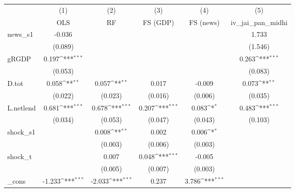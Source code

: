 {
\def\sym#1{\ifmmode^{#1}\else\(^{#1}\)\fi}
\begin{tabular}{l*{5}{c}}
\toprule
            &\multicolumn{1}{c}{(1)}&\multicolumn{1}{c}{(2)}&\multicolumn{1}{c}{(3)}&\multicolumn{1}{c}{(4)}&\multicolumn{1}{c}{(5)}\\
            &\multicolumn{1}{c}{OLS}&\multicolumn{1}{c}{RF}&\multicolumn{1}{c}{FS (GDP)}&\multicolumn{1}{c}{FS (news)}&\multicolumn{1}{c}{iv\_jai\_pan\_midhi}\\
\midrule
news\_s1     &      -0.036         &                     &                     &                     &       1.733         \\
            &     (0.089)         &                     &                     &                     &     (1.546)         \\
\addlinespace
gRGDP       &       0.197\sym{***}&                     &                     &                     &       0.263\sym{***}\\
            &     (0.053)         &                     &                     &                     &     (0.083)         \\
\addlinespace
D.tot       &       0.058\sym{**} &       0.057\sym{**} &       0.017         &      -0.009         &       0.073\sym{**} \\
            &     (0.022)         &     (0.023)         &     (0.016)         &     (0.006)         &     (0.035)         \\
\addlinespace
L.netlend   &       0.681\sym{***}&       0.678\sym{***}&       0.207\sym{***}&       0.083\sym{*}  &       0.483\sym{***}\\
            &     (0.034)         &     (0.053)         &     (0.047)         &     (0.043)         &     (0.103)         \\
\addlinespace
shock\_s1    &                     &       0.008\sym{**} &       0.002         &       0.006\sym{*}  &                     \\
            &                     &     (0.003)         &     (0.006)         &     (0.003)         &                     \\
\addlinespace
shock\_t     &                     &       0.007         &       0.048\sym{***}&      -0.005         &                     \\
            &                     &     (0.005)         &     (0.007)         &     (0.003)         &                     \\
\addlinespace
\_cons      &      -1.233\sym{***}&      -2.033\sym{***}&       0.237         &       3.786\sym{***}&                     \\

\end{tabular}}
